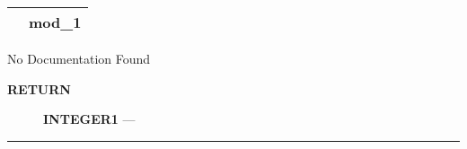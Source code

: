 {\renewcommand{\arraystretch}{1.5}
\begin{tabularx}{\textwidth}{|>{\raggedright\arraybackslash}l|X|}
\hline
\hspace{0pt}\mytexttt{\color{red} } & \textbf{mod\_1} \\
\hline
\end{tabularx}
}

\par





No Documentation Found








\par
\begin{description}
\item [\colorbox{tagtype}{\color{white} \textbf{\textsf{RETURN}}}] \textbf{INTEGER1} --- 
\end{description}




\rule{\linewidth}{0.5pt}


